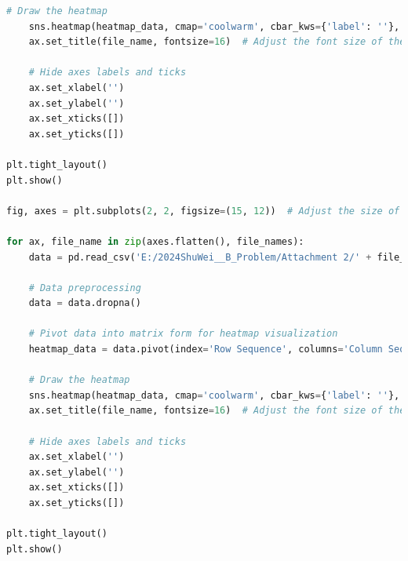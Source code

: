 \documentclass{swmcmthesis}
\begin{document}
\begin{lstlisting}[language=python,caption={The python programme for txt to csv and ploting for heatmaps }]
    # Draw the heatmap
    sns.heatmap(heatmap_data, cmap='coolwarm', cbar_kws={'label': ''}, ax=ax)
    ax.set_title(file_name, fontsize=16)  # Adjust the font size of the title

    # Hide axes labels and ticks
    ax.set_xlabel('')
    ax.set_ylabel('')
    ax.set_xticks([])
    ax.set_yticks([])

plt.tight_layout()
plt.show()

fig, axes = plt.subplots(2, 2, figsize=(15, 12))  # Adjust the size of the subplots

for ax, file_name in zip(axes.flatten(), file_names):
    data = pd.read_csv('E:/2024ShuWei__B_Problem/Attachment 2/' + file_name)
    
    # Data preprocessing
    data = data.dropna()
    
    # Pivot data into matrix form for heatmap visualization
    heatmap_data = data.pivot(index='Row Sequence', columns='Column Sequence', values='Target Property')
    
    # Draw the heatmap
    sns.heatmap(heatmap_data, cmap='coolwarm', cbar_kws={'label': ''}, ax=ax)
    ax.set_title(file_name, fontsize=16)  # Adjust the font size of the title

    # Hide axes labels and ticks
    ax.set_xlabel('')
    ax.set_ylabel('')
    ax.set_xticks([])
    ax.set_yticks([])

plt.tight_layout()
plt.show()

 \end{lstlisting}
\end{document}
